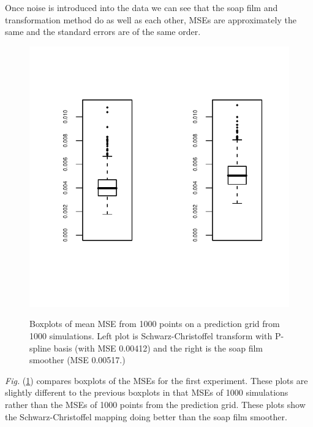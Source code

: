 \documentclass[a4paper,10pt]{amsart}
\newcommand{\sch}{Schwarz-Christoffel }
\newcommand{\Fig}[1]{\emph{Fig.} (\ref{#1})}
\begin{document}
Once noise is introduced into the data we can see that the soap film and transformation method do as well as each other, MSEs are approximately the same and the standard errors are of the same order.

\begin{figure}
\centering
\includegraphics[trim=0.5in 1in 0in 0.5in]{figs/1000boxplots.pdf} \\
\caption{Boxplots of mean MSE from 1000 points on a prediction grid from 1000 simulations. Left plot is \sch transform with P-spline basis (with MSE 0.00412) and the right is the soap film smoother (MSE 0.00517.)}
\label{1000boxplots}
\end{figure}

\Fig{1000boxplots} compares boxplots of the MSEs for the first experiment. These plots are slightly different to the previous boxplots in that MSEs of 1000 simulations rather than the MSEs of 1000 points from the prediction grid. These plots show the \sch mapping doing better than the soap film smoother.
\end{document}
